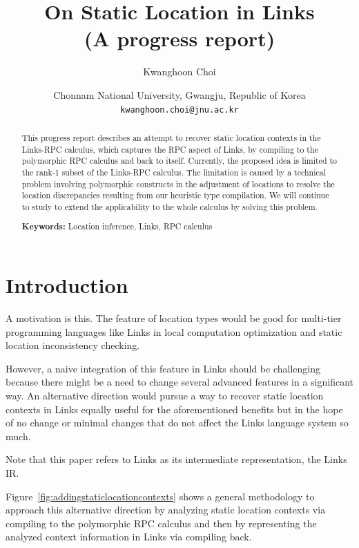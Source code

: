 \documentclass[a4paper]{article}
\title{On Static Location in Links\\(A progress report)}
\author{Kwanghoon Choi}
\date{
  Chonnam National University, Gwangju, Republic of Korea
  \\ \texttt{kwanghoon.choi@jnu.ac.kr}\\[2ex]%
}
\theoremstyle{plain}
\theoremstyle{definition}
\begin{document}
\maketitle

\begin{abstract}
%
This progress report describes an attempt to recover static location
contexts in the Links-RPC calculus, which captures the RPC aspect of
Links, by compiling to the polymorphic RPC calculus and back to
itself.
%
Currently, the proposed idea is limited to the rank-1 subset of the
Links-RPC calculus.
%
The limitation is caused by a technical problem involving polymorphic
constructs in the adjustment of locations to resolve the location
discrepancies resulting from our heuristic type compilation.
%
We will continue to study to extend the applicability to the whole
calculus by solving this problem.

\noindent\textbf{Keywords:} Location inference, Links, RPC calculus
\end{abstract}


\section{Introduction}
\label{sec:intro}

A motivation is this.
%
The feature of location types would be good for multi-tier programming
languages like Links in local computation optimization and static
location inconsistency checking.

%

%
However, a naive integration of this feature in Links should be
challenging because there might be a need to change several advanced
features in a significant way.
%
An alternative direction would pursue a way to recover static location
contexts in Links equally useful for the aforementioned benefits but
in the hope of no change or minimal changes that do not affect the
Links language system so much.

%
Note that this paper refers to Links as its intermediate
representation, the Links IR.

%
Figure~\ref{fig:addingstaticlocationcontexts} shows a general
methodology to approach this alternative direction by analyzing static
location contexts via compiling to the polymorphic RPC calculus and
then by representing the analyzed context information in Links via
compiling back.
\end{document}
